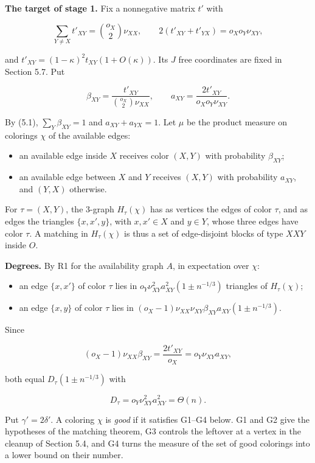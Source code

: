\documentclass[english,11pt,a4paper]{article}
\providecommand{\tightlist}{\setlength{\itemsep}{0pt}\setlength{\parskip}{0pt}}
\begin{document}
\textbf{The target of stage 1.} Fix a nonnegative matrix \(t'\) with

\nopagebreak[4]
\[\sum_{Y\ne X}t'_{XY}=\binom{o_X}{2}\nu_{XX},\qquad2(t'_{XY}+t'_{YX})=o_Xo_Y\nu_{XY},\tag{5.1}\]

and \(t'_{XY}=(1-\kappa)^2t_{XY}(1+O(\kappa))\). Its \(J\) free coordinates are fixed in Section 5.7. Put

\nopagebreak[4]
\[\beta_{XY}=\frac{t'_{XY}}{\binom{o_X}{2}\nu_{XX}},\qquad a_{XY}=\frac{2t'_{XY}}{o_Xo_Y\nu_{XY}}.\]

By (5.1), \(\sum_Y\beta_{XY}=1\) and \(a_{XY}+a_{YX}=1\). Let \(\mu\) be the product measure on colorings \(\chi\) of the available edges:

\begin{itemize}
\tightlist
\item
  an available edge inside \(X\) receives color \((X,Y)\) with probability \(\beta_{XY}\);
\item
  an available edge between \(X\) and \(Y\) receives \((X,Y)\) with probability \(a_{XY}\), and \((Y,X)\) otherwise.
\end{itemize}

For \(\tau=(X,Y)\), the 3-graph \(H_\tau(\chi)\) has as vertices the edges of color \(\tau\), and as edges the triangles \(\{x,x',y\}\), with \(x,x'\in X\) and \(y\in Y\), whose three edges have color \(\tau\). A matching in \(H_\tau(\chi)\) is thus a set of edge-disjoint blocks of type \(XXY\) inside \(O\).

\textbf{Degrees.} By R1 for the availability graph \(A\), in expectation over \(\chi\):

\begin{itemize}
\tightlist
\item
  an edge \(\{x,x'\}\) of color \(\tau\) lies in \(o_Y\nu_{XY}^2a_{XY}^2(1\pm n^{-1/3})\) triangles of \(H_\tau(\chi)\);
\item
  an edge \(\{x,y\}\) of color \(\tau\) lies in \((o_X-1)\nu_{XX}\nu_{XY}\beta_{XY}a_{XY}(1\pm n^{-1/3})\).
\end{itemize}

Since

\nopagebreak[4]
\[(o_X-1)\nu_{XX}\beta_{XY}=\frac{2t'_{XY}}{o_X}=o_Y\nu_{XY}a_{XY},\]

both equal \(D_\tau(1\pm n^{-1/3})\) with

\nopagebreak[4]
\[D_\tau=o_Y\nu_{XY}^2a_{XY}^2=\Theta(n).\]

Put \(\gamma'=2\delta'\). A coloring \(\chi\) is \emph{good} if it satisfies G1--G4 below. G1 and G2 give the hypotheses of the matching theorem, G3 controls the leftover at a vertex in the cleanup of Section 5.4, and G4 turns the measure of the set of good colorings into a lower bound on their number.
\end{document}

